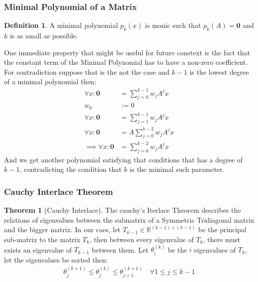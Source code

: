 \documentclass[]{article}
\theoremstyle{definition}
\newtheorem{theorem}{Theorem}  %
\newtheorem{definition}{Definition}
\begin{document}
        \subsubsection{Minimal Polynomial of a Matrix}
            \begin{definition}
                A minimal polynomial $p_k(x)$ is monic such that $p_k(A) = \mathbf{0}$ and $k$ is as small as possible. 
            \end{definition}
            One immediate property that might be useful for future constext is the fact that the constant term of the Minimal Polynomial has to have a non-zero coefficient. For contradiction suppose that is the not the case and $k-1$ is the lowest degree of a minimal polynomial then: 
            \begin{align}
                \forall x: \mathbf 0 &= \sum_{j = 0}^{k - 1}w_jA^jx
                \\
                w_0 &:= 0 
                \\
                \forall x: \mathbf 0 &= \sum_{j = 1}^{k - 1}w_jA^jx
                \\
                \forall x: \mathbf 0 &= A\sum_{j = 0}^{k - 2}w_jA^jx
                \\
                \implies \forall x : \mathbf 0 &= \sum_{j = 0}^{k - 2}w_jA^jx 
            \end{align}
            And we get another polynomial satisfying that conditions that has a degree of $k - 1$, contradicting the condition that $k$ is the minimal such parameter. 
        \subsubsection{Cauchy Interlace Theorem}
            \begin{theorem}[Cauchy Interlace]\label{theorem:Cauchy_Interlace}
                The cauchy's Iterlace Theorem describes the relations of eigenvalues between the submatrix of a Symmetric Tridiagonal matrix and the bigger matrix. In our caes, let $T_{k-1}\in \mathbb R^{(k - 1)\times (k - 1)}$ be the principal sub-matrix to the matrix $T_k$, then between every eigenvalue of $T_{k}$, there must exists an eigenvalue of $T_{k-1}$ between them. Let $\theta_i^{(k)}$ be the $i$ eigenvalues of $T_k$, let the eigenvalues be sorted then: 
                \begin{align}
                    \theta_{j}^{(k + 1)}
                    \le \theta_{j}^{(k)}
                    \le \theta_{j + 1}^{(k + 1)}
                    \quad \forall  1 \le j \le k - 1
                \end{align}
            \end{theorem}
\end{document}
